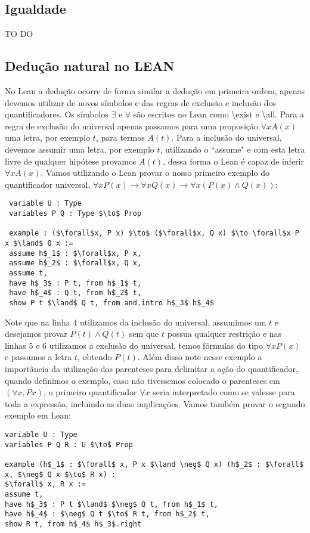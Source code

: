 \subsection{Igualdade}
TO DO 
\subsection{Dedução natural no LEAN}
No Lean a dedução ocorre de forma similar a dedução em primeira ordem, apenas devemos utilizar de novos símbolos e das 
regras de exclusão e inclusão dos quantificadores. Os símbolos $\exists $ e $\forall $ são escritos no Lean como \textbackslash exist 
e  \textbackslash all. Para a regra de exclusão do universal apenas passamos para uma proposição $\forall x A(x)$ uma letra,
por exemplo $t$, para termos $A(t)$. Para a inclusão do universal, devemos assumir uma letra, por exemplo $t$, utilizando o
``assume" e com esta letra livre de qualquer hipótese provamos $A(t)$, dessa forma o Lean é capaz de inferir $\forall x A(x)$.
\newline Vamos utilizando o Lean provar o nosso primeiro exemplo do quantificador universal, $\forall xP(x) \to \forall x Q(x) \to \forall x(P(x) \land Q(x))$:
\begin{lstlisting}
 variable U : Type
 variables P Q : Type $\to$ Prop

 example : ($\forall$x, P x) $\to$ ($\forall$x, Q x) $\to \forall$x P x $\land$ Q x :=  
 assume h$_1$ : $\forall$x, P x,
 assume h$_2$ : $\forall$x, Q x,
 assume t,
 have h$_3$ : P t, from h$_1$ t,
 have h$_4$ : Q t, from h$_2$ t,
 show P t $\land$ Q t, from and.intro h$_3$ h$_4$ 
\end{lstlisting}
Note que na linha 4 utilizamos da inclusão do universal, assumimos um $t$ e desejamos provar $P(t) \land Q(t)$ 
sem que $t$ possua qualquer restrição e nas linhas 5 e 6 utilizamos a exclusão do universal, temos fórmulas do
tipo $\forall x P(x)$ e passamos a letra $t$, obtendo $P(t)$. Além disso note nesse exemplo a importância da utilização
dos parenteses para delimitar a ação do quantificador, quando definimos o exemplo, caso não tivessemos colocado
o parenteses em  $(\forall x, P x)$, o primeiro quantificador $\forall x$ seria interpretado como se valesse para toda
a expressão, incluindo as duas implicações.
\newline Vamos também provar o segundo exemplo em Lean:
\begin{lstlisting}
variable U : Type
variables P Q R : U $\to$ Prop

example (h$_1$ : $\forall$ x, P x $\land \neg$ Q x) (h$_2$ : $\forall$ x, $\neg$ Q x $\to$ R x) :
$\forall$ x, R x :=
assume t,
have h$_3$ : P t $\land$ $\neg$ Q t, from h$_1$ t,
have h$_4$ : $\neg$ Q t $\to$ R t, from h$_2$ t,
show R t, from h$_4$ h$_3$.right
\end{lstlisting}
